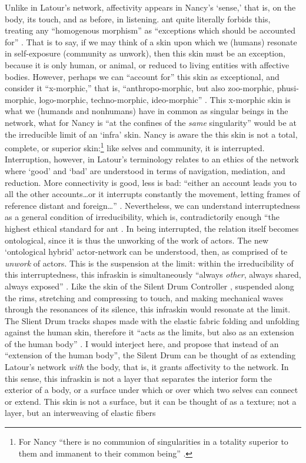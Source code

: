 Unlike in Latour's network, affectivity appears in Nancy's `sense,' that is, on the body, its touch, and as before, in listening. \gls{ant} quite literally forbids this, treating any ``homogenous morphism'' as ``exceptions which should be accounted for'' \parencite[16]{Lat90:On}. That is to say, if we may think of a skin upon which we (humans) resonate in self-exposure (community as unwork), then this skin must be an exception, because it is only human, or animal, or reduced to living entities with affective bodies. However, perhaps we can ``account for'' this skin as exceptional, and consider it ``x-morphic,'' that is, ``anthropo-morphic, but also zoo-morphic, phusi-morphic, logo-morphic, techno-morphic, ideo-morphic'' \parencite[16]{Lat90:On}. This x-morphic skin is what we (humands and nonhumans) have in common as singular beings in the network, what for Nancy is ``at the confines of the \textit{same} singularity'' \parencite[28]{Nan91:The} would be at the irreducible limit of an `infra' skin. Nancy is aware the this skin is not a total, complete, or superior skin:\footnote{For Nancy ``there is no communion of singularities in a totality superior to them and immanent to their common being'' \parencite[28]{Nan91:The}.} like selves and community, it is interrupted. Interruption, however, in Latour's terminology relates to an ethics of the network where `good' and `bad' are understood in terms of navigation, mediation, and reduction. More connectivity is good, less is bad: ``either an account leads you to all the other accounts\dots or it interrupts constantly the movement, letting frames of reference distant and foreign\dots'' \parencite[13-14]{Lat90:On}. Nevertheless, we can understand interruptedness as a general condition of irreducibility, which is, contradictorily enough ``the highest ethical standard for \gls{ant} \parencite[14]{Lat90:On}. In being interrupted, the relation itself becomes ontological, since it is thus the unworking of the work of actors. The new `ontological hybrid' actor-network can be understood, then, as comprised of te \textit{unwork} of actors. This is the suspension at the limit: within the irreducibility of this interruptedness, this infraskin is simultaneously ``always \textit{other}, always shared, always exposed'' \parencite[28]{Nan91:The}. Like the skin of the Silent Drum Controller , suspended along the rims, stretching and compressing to touch, and making mechanical waves through the resonances of its silence, this infraskin would resonate at the limit. The Slient Drum tracks shapes made with the elastic fabric folding and unfolding against the human skin, therefore it ``acts as the limits, but also as an extension of the human body'' \parencite[2]{DBLP:conf/icmc/OliverJ08}. I would interject here, and propose that instead of an ``extension of the human body'', the Silent Drum can be thought of as extending Latour's network \textit{with} the body, that is, it grants affectivity to the network. In this sense, this infraskin is not a layer that separates the interior form the exterior of a body, or a surface under which or over which two selves can connect or extend. This skin is not a surface, but it can be thought of as a texture; not a layer, but an interweaving of elastic fibers 